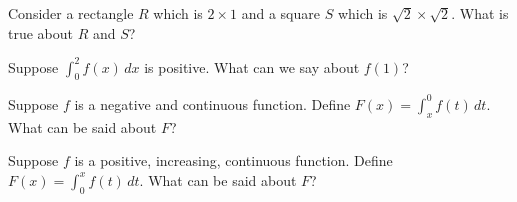 \documentclass{ximera}
\newcommand{\recommendation}[1]{}
\begin{document}
\begin{problem}
  Consider a rectangle $R$ which is $2 \times 1$ and a square $S$
  which is $\sqrt{2} \times \sqrt{2}$.  What is true about $R$ and
  $S$?
  \begin{multipleChoice}
  \end{multipleChoice}
\end{problem}

\begin{problem}
  Suppose $\int_0^2 f(x) \, dx$ is positive.  What can we say about $f(1)$?
  \begin{multipleChoice}
  \end{multipleChoice}
\end{problem}



\begin{problem}
  Suppose $f$ is a negative and continuous function.  Define $F(x) = \int_x^0 f(t) \, dt$.  What can be said about $F$?
  \begin{multipleChoice}
  \end{multipleChoice}
\end{problem}

\begin{problem}
  Suppose $f$ is a positive, increasing, continuous function.  Define $F(x) = \int_0^x f(t) \, dt$.  What can be said about $F$?
  \begin{multipleChoice}
  \end{multipleChoice}
\end{problem}
\end{document}
